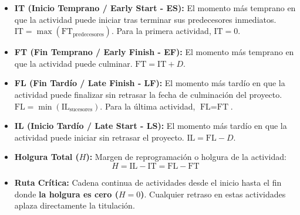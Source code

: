 \documentclass[11pt,a4paper]{article}
\begin{document}
\begin{center}
\end{center}

\vspace{-0.2cm}

\begin{itemize}\setlength\itemsep{1pt}
    \item \textbf{IT (Inicio Temprano / Early Start - ES):} El momento más temprano en que la actividad puede iniciar tras terminar sus predecesores inmediatos. $\text{IT} = \max(\text{FT}_{\text{predecesores}})$. Para la primera actividad, $\text{IT} = 0$.
    \item \textbf{FT (Fin Temprano / Early Finish - EF):} El momento más temprano en que la actividad puede culminar. $\text{FT} = \text{IT} + D$.
    \item \textbf{FL (Fin Tardío / Late Finish - LF):} El momento más tardío en que la actividad puede finalizar sin retrasar la fecha de culminación del proyecto. $\text{FL} = \min(\text{IL}_{\text{sucesores}})$. Para la última actividad, $\text{FL} = \text{FT}$.
    \item \textbf{IL (Inicio Tardío / Late Start - LS):} El momento más tardío en que la actividad puede iniciar sin retrasar el proyecto. $\text{IL} = \text{FL} - D$.
    \item \textbf{Holgura Total ($H$):} Margen de reprogramación o holgura de la actividad:
    \begin{equation}
        H = \text{IL} - \text{IT} = \text{FL} - \text{FT}
    \end{equation}
    \item \textbf{Ruta Crítica:} Cadena continua de actividades desde el inicio hasta el fin donde \textbf{la holgura es cero ($H = 0$)}. Cualquier retraso en estas actividades aplaza directamente la titulación.
\end{itemize}
\end{document}
